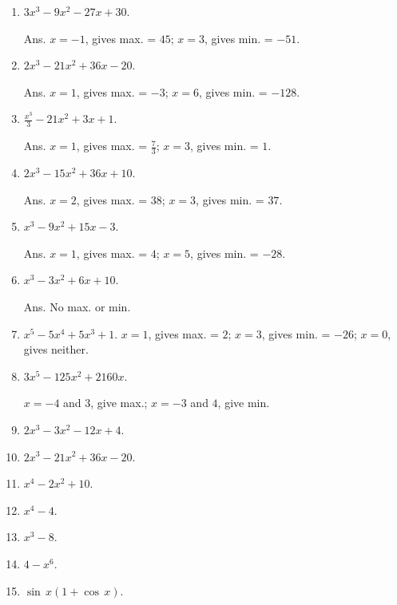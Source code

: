 \begin{enumerate}
\addtocounter{enumi}{86}

\item
$3x^3 - 9x^2 - 27x + 30$. 	

Ans. 	$x = -1$, gives max. = $45$;
  	$x = 3$, gives min. = $- 51$.

\item
$2x^3 - 21x^2 + 36x - 20$. 

Ans. $x = 1$, gives max. = $-3$;
$x = 6$, gives min. = $-128$.

\item
$\frac{x^3}{3} - 21x^2 + 3x + 1$. 

Ans. $x = 1$, gives max. = $\frac{7}{3}$;
$x = 3$, gives min. = $1$.

\item
$2x^3 - 15x^2 + 36x + 10$.

Ans. $x = 2$, gives max. = $38$;
$x = 3$, gives min. = $37$.

\item
$x^3 - 9x^2 + 15x - 3$. 

Ans. $x = 1$, gives max. = $4$;
$x = 5$, gives min. = $- 28$.

\item
$x^3 - 3x^2 + 6x + 10$.

Ans.  	No max. or min.

\item
$x^5 - 5x^4 + 5x^3 + 1$. $x = 1$, gives max. = $2$;
$x = 3$, gives min. = $-26$; $x = 0$, gives neither.

\item
$3x^5 - 125x^2 + 2160x$. 

$x = -4$ and $3$, give max.;
$x = -3$ and $4$, give min.

\item
$2x^3 - 3x^2 - 12x + 4$.

\item
$2x^3 - 21x^2 + 36x - 20$.

\item
$x^4 - 2x^2 + 10$.

\item
$x^4 - 4$.

\item
$x^3 - 8$.

\item
$4 - x^6$.

\item
$\sin\,x(1 + \cos\,x)$. 	


\end{enumerate}
